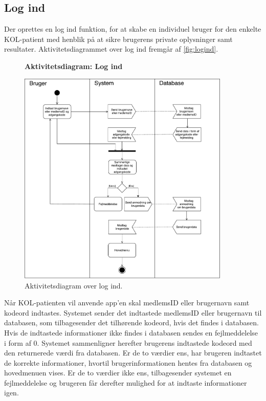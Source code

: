 \subsection*{Log ind}
Der oprettes en log ind funktion, for at skabe en individuel bruger for den enkelte KOL-patient med henblik på at sikre brugerens private oplysninger samt resultater. Aktivitetsdiagrammet over log ind fremgår af \autoref{fig:logind}. 

\begin{figure} [H]
\centering
\textbf{Aktivitetsdiagram: Log ind}\par\medskip
\includegraphics[width=0.9\textwidth]{figures/aktivitetsdiagram/Logind}
\caption{Aktivitetsdiagram over log ind.}
\label{fig:logind}
\end{figure}


\noindent
Når KOL-patienten vil anvende app'en skal medlemsID eller brugernavn samt kodeord indtastes. Systemet sender det indtastede medlemsID eller brugernavn til databasen, som tilbagesender det tilhørende kodeord, hvis det findes i databasen. Hvis de indtastede informationer ikke findes i databasen sendes en fejlmeddelelse i form af 0. Systemet sammenligner herefter brugerens indtastede kodeord med den returnerede værdi fra databasen. Er de to værdier ens, har brugeren indtastet de korrekte informationer, hvortil brugerinformationen hentes fra databasen og hovedmenuen vises. Er de to værdier ikke ens, tilbagesender systemet en fejlmeddelelse og brugeren får derefter mulighed for at indtaste informationer igen. 